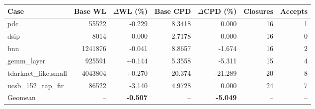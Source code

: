 \begin{tabular}{lrrrrrr}
\toprule
Case & Base WL & $\Delta$WL (\%) & Base CPD & $\Delta$CPD (\%) & Closures & Accepts \\
\midrule
pdc & 55522 & -0.229 & 8.3418 & 0.000 & 16 & 1 \\
dsip & 8014 & 0.000 & 2.7178 & 0.000 & 16 & 0 \\
bnn & 1241876 & -0.041 & 8.8657 & -1.674 & 16 & 2 \\
gemm\_layer & 925591 & +0.144 & 5.3558 & -5.311 & 15 & 4 \\
tdarknet\_like.small & 4043804 & +0.270 & 20.374 & -21.289 & 20 & 8 \\
ucsb\_152\_tap\_fir & 86522 & -3.140 & 4.9728 & 0.000 & 24 & 7 \\
\midrule
Geomean & -- & \textbf{-0.507} & -- & \textbf{-5.049} & -- & -- \\
\bottomrule
\end{tabular}
